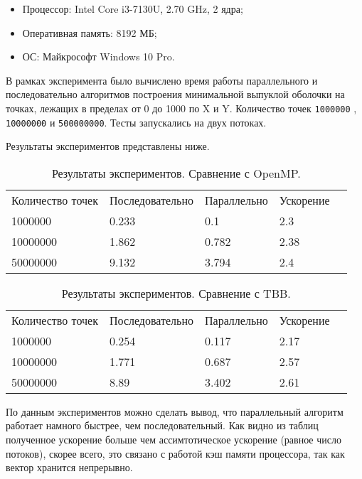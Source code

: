 \documentclass{report}
\begin{document}
\begin{itemize}
\item Процессор: Intel Core i3-7130U, 2.70 GHz, 2 ядра;
\item Оперативная память: 8192 МБ;
\item ОС: Майкрософт Windows 10 Pro.
\end{itemize}

\par В рамках эксперимента было вычислено время работы параллельного и последовательно алгоритмов построения минимальной выпуклой оболочки на точках, лежащих в пределах от 0 до 1000 по X и Y. Количество точек \verb|1000000| , \verb|10000000| и \verb|500000000|. Тесты запускались на двух потоках.
\par Результаты экспериментов представлены ниже.

\begin{table}[!h]
\caption{Результаты экспериментов. Сравнение с OpenMP.}
\centering
\begin{tabular}{lllll}
Количество точек & Последовательно & Параллельно & Ускорение  \\
1000000        & 0.233         & 0.1     & 2.3       \\
10000000        & 1.862         & 0.782     & 2.38       \\
50000000       & 9.132         & 3.794     & 2.4       
\end{tabular}
\end{table}

\begin{table}[!h]
\caption{Результаты экспериментов. Сравнение с TBB.}
\centering
\begin{tabular}{lllll}
Количество точек & Последовательно & Параллельно & Ускорение  \\
1000000        & 	0.254         & 0.117     & 	2.17       \\
10000000        & 1.771         & 0.687     & 2.57       \\
50000000       & 8.89         & 3.402     & 2.61       
\end{tabular}
\end{table}

\par По данным экспериментов можно сделать вывод, что параллельный алгоритм работает намного быстрее, чем последовательный. Как видно из таблиц полученное ускорение больше чем ассимтотическое ускорение (равное число потоков), скорее всего, это связано с работой кэш памяти процессора, так как вектор хранится непрерывно.
\newpage
\end{document}
